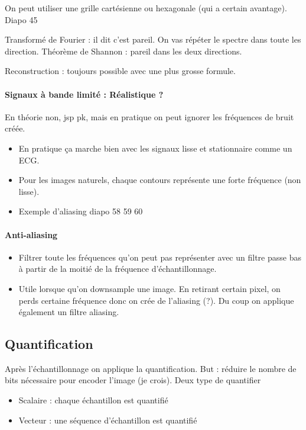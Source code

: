 \documentclass{article}
\theoremstyle{plain}%
\theoremstyle{definition}
\theoremstyle{remark}
\begin{document}
On peut utiliser une grille cartésienne ou hexagonale (qui a certain avantage). Diapo 45

Transformé de Fourier : il dit c'est pareil. On vas répéter le spectre dans toute les direction. Théorème de Shannon : pareil dans les deux directions. 

Reconstruction : toujours possible avec une plus grosse formule.

\paragraph*{Signaux à bande limité : Réalistique ? } En théorie non, jsp pk, mais en pratique on peut ignorer les fréquences de bruit créée. \begin{itemize}
    \item En pratique ça marche bien avec les signaux lisse et stationnaire comme un ECG.
    \item Pour les images naturels, chaque contours représente une forte fréquence (non lisse).
    \item Exemple d'aliasing diapo 58 59 60
\end{itemize}

\paragraph*{Anti-aliasing}
\begin{itemize}
    \item Filtrer toute les fréquences qu'on peut pas représenter avec un filtre passe bas à partir de la moitié de la fréquence d'échantillonnage. 
    \item Utile lorsque qu'on downsample une image. En retirant certain pixel, on perds certaine fréquence donc on crée de l'aliasing (?). Du coup on applique également un filtre aliasing.
\end{itemize}

\subsection{Quantification}
Après l'échantillonnage on applique la quantification. But : réduire le nombre de bits nécessaire pour encoder l'image (je crois). Deux type de quantifier \begin{itemize}
    \item Scalaire : chaque échantillon est quantifié
    \item Vecteur : une séquence d'échantillon est quantifié
\end{itemize}
\end{document}
